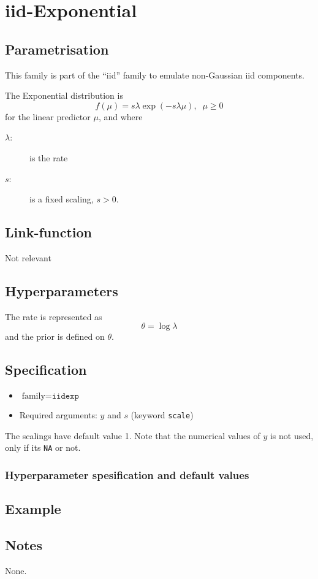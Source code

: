 \documentclass[a4paper,11pt]{article}
\begin{document}
\section*{iid-Exponential}

\subsection*{Parametrisation}

This family is part of the ``iid'' family to emulate non-Gaussian iid
components.


The Exponential distribution is
\begin{displaymath}
    f(\mu) = s\lambda \exp(-s\lambda \mu), \;\; \mu\ge 0
\end{displaymath}
for the linear predictor $\mu$, and where
\begin{description}
\item[$\lambda$:] is the rate
\item[$s$:] is a fixed scaling, $s>0$.    
\end{description}

\subsection*{Link-function}

Not relevant

\subsection*{Hyperparameters}

The rate is represented as
\begin{displaymath}
    \theta = \log \lambda
\end{displaymath}
and the prior is defined on $\theta$. 

\subsection*{Specification}

\begin{itemize}
\item $\text{family}=\texttt{iidexp}$
\item Required arguments: $y$ and $s$ (keyword \texttt{scale})
\end{itemize}
The scalings have default value 1. Note that the numerical values of
$y$ is not used, only if its \texttt{NA} or not. 

\subsubsection*{Hyperparameter spesification and default values}




\subsection*{Example}



\subsection*{Notes}

None.
\end{document}
